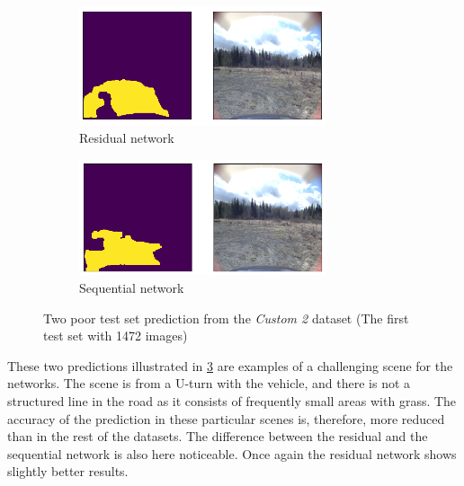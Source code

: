\documentclass[USenglish]{ifimaster}  %
\begin{document}
\begin{figure}[ht]
\centering
\begin{subfigure}[b]{\textwidth}
\centering
\includegraphics[width=0.8\textwidth]{bilder/custom_2/154_res_poor.png}
\caption{Residual network}
\label{fig:custom_2_poor_res}
\end{subfigure}
\hfill
\begin{subfigure}[b]{\textwidth}
\centering
\includegraphics[width=0.8\textwidth]{bilder/custom_2/154_seq_poor.png}
\caption{Sequential network}
\label{fig:custom_2_poor_seq}
\end{subfigure}
\caption{Two poor test set prediction from the \textit{Custom 2} dataset (The first test set with 1472 images)}
\label{fig:custom_2_poor}
\end{figure}

These two predictions illustrated in \cref{fig:custom_2_poor} are examples of a challenging scene for the networks. The scene is from a U-turn with the vehicle, and there is not a structured line in the road as it consists of frequently small areas with grass. The accuracy of the prediction in these particular scenes is, therefore, more reduced than in the rest of the datasets. The difference between the residual and the sequential network is also here noticeable. Once again the residual network shows slightly better results.
\end{document}
